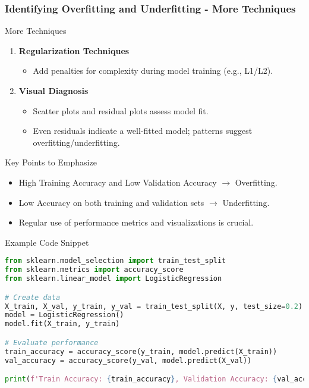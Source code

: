 \documentclass[aspectratio=169]{beamer}
\begin{document}
\begin{frame}[fragile]
    \frametitle{Identifying Overfitting and Underfitting - More Techniques}
    \begin{block}{More Techniques}
        \begin{enumerate}[resume]
            \item \textbf{Regularization Techniques}
            \begin{itemize}
                \item Add penalties for complexity during model training (e.g., L1/L2).
            \end{itemize}
            
            \item \textbf{Visual Diagnosis}
            \begin{itemize}
                \item Scatter plots and residual plots assess model fit.
                \item Even residuals indicate a well-fitted model; patterns suggest overfitting/underfitting.
            \end{itemize}
        \end{enumerate}
    \end{block}
    
    \begin{block}{Key Points to Emphasize}
        \begin{itemize}
            \item High Training Accuracy and Low Validation Accuracy $\rightarrow$ Overfitting.
            \item Low Accuracy on both training and validation sets $\rightarrow$ Underfitting.
            \item Regular use of performance metrics and visualizations is crucial.
        \end{itemize}
    \end{block}
\end{frame}

\begin{frame}[fragile]{Example Code Snippet}
    \begin{lstlisting}[language=Python]
from sklearn.model_selection import train_test_split
from sklearn.metrics import accuracy_score
from sklearn.linear_model import LogisticRegression

# Create data
X_train, X_val, y_train, y_val = train_test_split(X, y, test_size=0.2)
model = LogisticRegression()
model.fit(X_train, y_train)

# Evaluate performance
train_accuracy = accuracy_score(y_train, model.predict(X_train))
val_accuracy = accuracy_score(y_val, model.predict(X_val))

print(f'Train Accuracy: {train_accuracy}, Validation Accuracy: {val_accuracy}')
    \end{lstlisting}
\end{frame}
\end{document}
